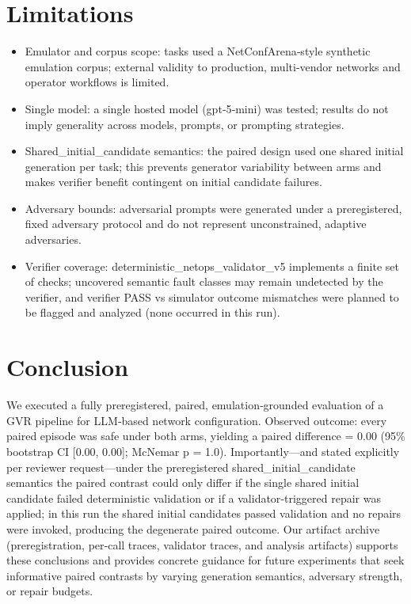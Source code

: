 \documentclass[conference]{IEEEtran}
\begin{document}
\section{Limitations}
\begin{itemize}
\item Emulator and corpus scope: tasks used a NetConfArena‑style synthetic emulation corpus; external validity to production, multi‑vendor networks and operator workflows is limited.
\item Single model: a single hosted model (gpt‑5‑mini) was tested; results do not imply generality across models, prompts, or prompting strategies.
\item Shared\_initial\_candidate semantics: the paired design used one shared initial generation per task; this prevents generator variability between arms and makes verifier benefit contingent on initial candidate failures.
\item Adversary bounds: adversarial prompts were generated under a preregistered, fixed adversary protocol and do not represent unconstrained, adaptive adversaries.
\item Verifier coverage: deterministic\_netops\_validator\_v5 implements a finite set of checks; uncovered semantic fault classes may remain undetected by the verifier, and verifier PASS vs simulator outcome mismatches were planned to be flagged and analyzed (none occurred in this run).
\end{itemize}

\section{Conclusion}
We executed a fully preregistered, paired, emulation‑grounded evaluation of a GVR pipeline for LLM‑based network configuration. Observed outcome: every paired episode was safe under both arms, yielding a paired difference = 0.00 (95\% bootstrap CI [0.00, 0.00]; McNemar p = 1.0). Importantly---and stated explicitly per reviewer request---under the preregistered shared\_initial\_candidate semantics the paired contrast could only differ if the single shared initial candidate failed deterministic validation or if a validator‑triggered repair was applied; in this run the shared initial candidates passed validation and no repairs were invoked, producing the degenerate paired outcome. Our artifact archive (preregistration, per‑call traces, validator traces, and analysis artifacts) supports these conclusions and provides concrete guidance for future experiments that seek informative paired contrasts by varying generation semantics, adversary strength, or repair budgets.
\end{document}
